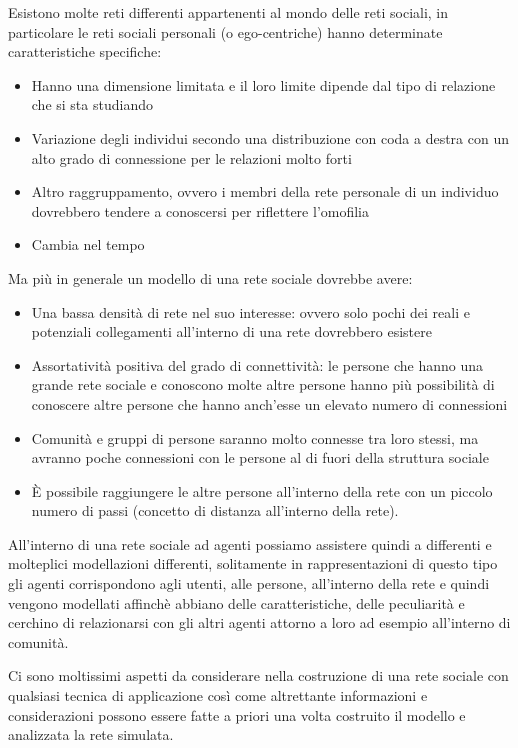 Esistono molte reti differenti appartenenti al mondo delle reti sociali, in particolare le reti sociali personali (o ego-centriche) hanno determinate caratteristiche specifiche:
\begin{itemize}
    \item Hanno una dimensione limitata e il loro limite dipende dal tipo di relazione che si sta studiando
    \item Variazione degli individui secondo una distribuzione con coda a destra con un alto grado di connessione per le relazioni molto forti
    \item Altro raggruppamento, ovvero i membri della rete personale di un individuo dovrebbero tendere a conoscersi per riflettere l'omofilia
    \item Cambia nel tempo
\end{itemize}

Ma più in generale un modello di una rete sociale dovrebbe avere:
\begin{itemize}
    \item Una bassa densità di rete nel suo interesse: ovvero solo pochi dei reali e potenziali collegamenti all'interno di una rete dovrebbero esistere
    \item Assortatività positiva del grado di connettività: le persone che hanno una grande rete sociale e conoscono molte altre persone hanno più possibilità di conoscere altre persone che hanno anch'esse un elevato numero di connessioni
    \item Comunità e gruppi di persone saranno molto connesse tra loro stessi, ma avranno poche connessioni con le persone al di fuori della struttura sociale 
    \item È possibile raggiungere le altre persone all'interno della rete con un piccolo numero di passi (concetto di distanza all'interno della rete).
\end{itemize}

All'interno di una rete sociale ad agenti possiamo assistere quindi a differenti e molteplici modellazioni differenti, solitamente in rappresentazioni di questo tipo gli agenti corrispondono agli utenti, alle persone, all'interno della rete e quindi vengono modellati affinchè abbiano delle caratteristiche, delle peculiarità e cerchino di relazionarsi con gli altri agenti attorno a loro ad esempio all'interno di comunità.

Ci sono moltissimi aspetti da considerare nella costruzione di una rete sociale con qualsiasi tecnica di applicazione così come altrettante informazioni e considerazioni possono essere fatte a priori una volta costruito il modello e analizzata la rete simulata.

